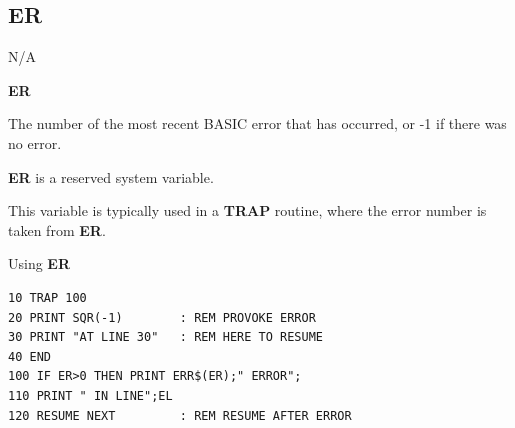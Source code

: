 \subsection{ER}
\begin{description}[leftmargin=2cm,style=nextline]
\item [Token:]    N/A

\item [Format:]   {\bf ER}

\item [Usage:]    The number of the most recent BASIC error that has occurred, or -1 if there was no error.

\item [Remarks:]  {\bf ER} is a reserved system variable.

                  This variable is typically used in a {\bf TRAP} routine, where the error number is taken from {\bf ER}.

\item [Example:]  Using {\bf ER}

\begin{tcolorbox}[colback=black,coltext=white]
\verbatimfont{\codefont}
\begin{verbatim}
10 TRAP 100
20 PRINT SQR(-1)        : REM PROVOKE ERROR
30 PRINT "AT LINE 30"   : REM HERE TO RESUME
40 END
100 IF ER>0 THEN PRINT ERR$(ER);" ERROR";
110 PRINT " IN LINE";EL
120 RESUME NEXT         : REM RESUME AFTER ERROR
\end{verbatim}
\end{tcolorbox}
\end{description}


\newpage
